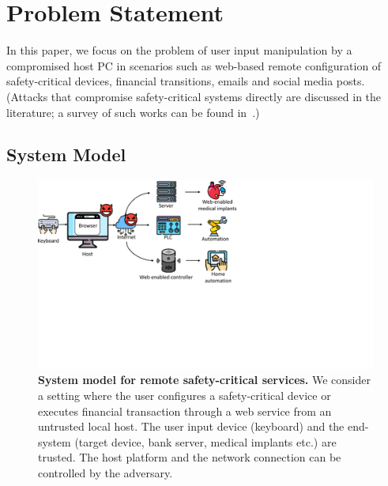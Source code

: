 \section{Problem Statement}
\label{sec:problemStatement_IK}

In this paper, we focus on the problem of user input manipulation by a compromised host PC in scenarios such as web-based remote configuration of safety-critical devices, financial transitions, emails and social media posts. (Attacks that compromise safety-critical systems directly are discussed in the literature; a survey of such works can be found in~\cite{fachkha2017internet}.)



\subsection{System Model}

\begin{figure}[t]
    \centering
    \includegraphics[trim={0 8cm 14cm 0},clip,width=0.8\linewidth]{chapters/IntegriKey/images/Motivation.pdf}
    \caption[System model for remote safety-critical services]{\textbf{System model for remote safety-critical services.} We consider a setting where the user configures a safety-critical device or executes financial transaction through a web service from an untrusted local host. The user input device (keyboard) and the end-system (target device, bank server, medical implants etc.) are trusted. The host platform and the network connection can be controlled by the adversary.} 

    \label{fig:systemModel}
\end{figure}

